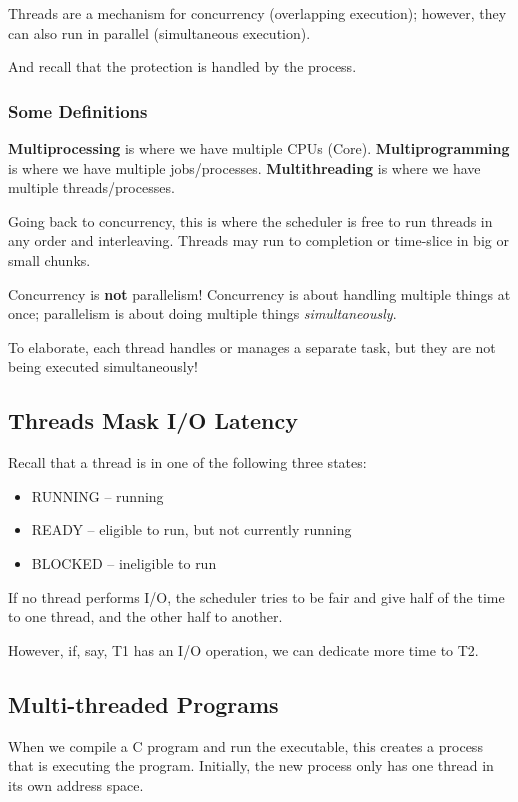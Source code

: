 \documentclass[openany]{book}
\begin{document}
Threads are a mechanism for concurrency (overlapping execution); however, they can also run in parallel (simultaneous execution).

And recall that the protection is handled by the process.

\subsubsection{Some Definitions}
\begin{defn}
	\textbf{Multiprocessing} is where we have multiple CPUs (Core). \textbf{Multiprogramming} is where we have multiple jobs/processes. \textbf{Multithreading} is where we have multiple threads/processes.
\end{defn}

Going back to concurrency, this is where the scheduler is free to run threads in any order and interleaving. Threads may run to completion or time-slice in big or small chunks.

\begin{warn}
	Concurrency is \textbf{not} parallelism! Concurrency is about handling multiple things at once; parallelism is about doing multiple things \textit{simultaneously}.
\end{warn}

To elaborate, each thread handles or manages a separate task, but they are not being executed simultaneously!

\subsection{Threads Mask I/O Latency}
Recall that a thread is in one of the following three states:
\begin{itemize}
	\item RUNNING -- running
	\item READY -- eligible to run, but not currently running
	\item BLOCKED -- ineligible to run
\end{itemize}

If no thread performs I/O, the scheduler tries to be fair and give half of the time to one thread, and the other half to another.

However, if, say, T1 has an I/O operation, we can dedicate more time to T2.

\subsection{Multi-threaded Programs}
When we compile a C program and run the executable, this creates a process that is executing the program. Initially, the new process only has one thread in its own address space.
\end{document}
